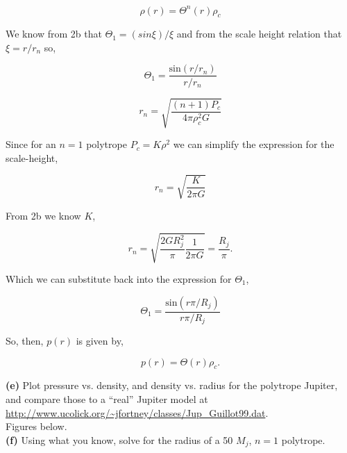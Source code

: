 \documentclass[12pt]{article}
\begin{document}
\begin{equation}
\rho \left( r \right) = \Theta^n\left( r \right) \rho_c
\end{equation}

\noindent We know from 2b that $\Theta_1 = \left( sin \xi \right)/\xi$ and from the scale height relation that $\xi = r/r_n$ so, 

\begin{equation}
\Theta_1 = \frac{\mathrm{sin}\left( r/r_n \right)}{r/r_n}
\end{equation}

\noindent

\begin{equation}
r_n = \sqrt{\frac{\left(n+1\right)P_c}{4\pi \rho_c^2 G}}
\end{equation}

\noindent Since for an $n=1$ polytrope $P_c = K\rho^2$ we can simplify the expression for the scale-height, 

\begin{equation}
r_n = \sqrt{\frac{K}{2\pi G}}
\end{equation}

\noindent From 2b we know $K$,

\begin{equation}
r_n = \sqrt{\frac{2GR_j^2}{\pi}\frac{1}{2\pi G}} = \frac{R_j}{\pi}.
\end{equation}

\noindent Which we can substitute back into the expression for $\Theta_1$,

\begin{equation}
\Theta_1 = \frac{\mathrm{sin}\left( r\pi/R_j \right)}{r\pi/R_j}
\end{equation}

\noindent So, then, $p\left (r\right)$ is given by,

\begin{equation}
p\left (r\right) = \Theta\left(r \right)\rho_c.
\end{equation}

\noindent \textbf{(e)} Plot pressure vs. density, and density vs. radius for the polytrope Jupiter, and compare those to a ``real'' Jupiter model at \url{http://www.ucolick.org/~jfortney/classes/Jup_Guillot99.dat}.\\

\noindent Figures below. \\

\noindent \textbf{(f)} Using what you know, solve for the radius of a 50 $M_j$, $n=1$ polytrope. \\
\end{document}
